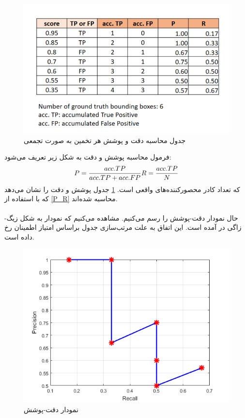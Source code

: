 \begin{figure}[h!]
    \centering
    \includegraphics[width=0.75\linewidth]{figures/precision_recall_calculation.png}
    \caption{جدول محاسبه دقت و پوشش هر تخمین به صورت تجمعی}
    \label{fig:precision_recall_calculation}
\end{figure}

فرمول محاسبه پوشش و دقت به شکل زیر تعریف می‌شود:
\begin{equation}
    P = \dfrac{acc.TP}{acc.TP + acc.FP}\\
    R = \dfrac{acc.TP}{N}
    \label{P_R}
\end{equation}
که  تعداد کادر محصورکننده‌های واقعی است. \cref{fig:precision_recall_calculation} جدول پوشش و دقت را نشان می‌دهد که با استفاده از \cref{P_R} محاسبه شده‌اند.
\\
\\
حال نمودار دقت-پوشش را رسم می‌کنیم. مشاهده می‌کنیم که نمودار به شکل زیگ-زاگی در آمده است. این اتفاق به علت مرتب‌سازی جدول براساس امتیاز اطمینان رخ داده است.

\begin{figure}[h!]
    \centering
    \includegraphics[width=0.8\linewidth]{figures/precision-recall_plot.png}
    \caption{نمودار دقت-پوشش}
    \label{fig:enter-label}
\end{figure}

